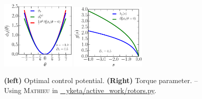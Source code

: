 \documentclass[pre,aps,superscriptaddress,nofootinbib]{revtex4}
\begin{document}
\begin{figure}[H]
\centering
\includegraphics[width=0.32\textwidth]{mathieu_potential.eps}
\includegraphics[width=0.32\textwidth]{distribution_g.eps}
\caption{\textbf{(left)} Optimal control potential. \textbf{(Right)} Torque parameter. -- Using \textsc{Mathieu} in \href{https://github.com/yketa/active_work/blob/master/rotors.py}{\faGithub~ yketa/active\_work/rotors.py}.}
\label{mathieu_potential_fig}
\end{figure}


{\renewcommand{\bibname}{References}}
\end{document}
